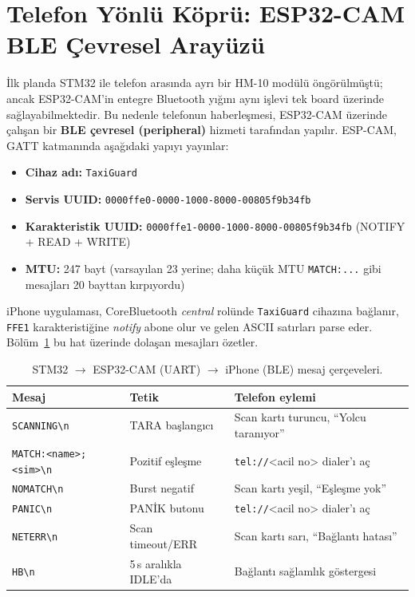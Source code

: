 \section{Telefon Yönlü Köprü: ESP32-CAM BLE Çevresel Arayüzü}

İlk planda STM32 ile telefon arasında ayrı bir HM-10 modülü öngörülmüştü;
ancak ESP32-CAM'in entegre Bluetooth yığını aynı işlevi tek board üzerinde
sağlayabilmektedir. Bu nedenle telefonun haberleşmesi, ESP32-CAM üzerinde
çalışan bir \textbf{BLE çevresel (peripheral)} hizmeti tarafından yapılır.
ESP-CAM, GATT katmanında aşağıdaki yapıyı yayınlar:

\begin{itemize}
    \item \textbf{Cihaz adı:} \texttt{TaxiGuard}
    \item \textbf{Servis UUID:} \texttt{0000ffe0-0000-1000-8000-00805f9b34fb}
    \item \textbf{Karakteristik UUID:} \texttt{0000ffe1-0000-1000-8000-00805f9b34fb}
          (NOTIFY + READ + WRITE)
    \item \textbf{MTU:} 247 bayt (varsayılan 23 yerine; daha küçük MTU
          \texttt{MATCH:...} gibi mesajları 20 bayttan kırpıyordu)
\end{itemize}

iPhone uygulaması, CoreBluetooth \emph{central} rolünde
\texttt{TaxiGuard} cihazına bağlanır, \texttt{FFE1} karakteristiğine
\emph{notify} abone olur ve gelen ASCII satırları parse eder.
Bölüm~\ref{tab:mesaj-cercevesi} bu hat üzerinde dolaşan mesajları özetler.

\begin{table}[h!]
\centering
\caption{STM32 $\rightarrow$ ESP32-CAM (UART) $\rightarrow$ iPhone (BLE) mesaj çerçeveleri.}
\label{tab:mesaj-cercevesi}
\small
\begin{tabular}{l l l}
\toprule
\textbf{Mesaj} & \textbf{Tetik} & \textbf{Telefon eylemi}\\
\midrule
\texttt{SCANNING\textbackslash n} & TARA başlangıcı     & Scan kartı turuncu, ``Yolcu taranıyor''\\
\texttt{MATCH:<name>;<sim>\textbackslash n} & Pozitif eşleşme & \texttt{tel://}<acil no> dialer'ı aç\\
\texttt{NOMATCH\textbackslash n}  & Burst negatif       & Scan kartı yeşil, ``Eşleşme yok''\\
\texttt{PANIC\textbackslash n}    & PANİK butonu        & \texttt{tel://}<acil no> dialer'ı aç\\
\texttt{NETERR\textbackslash n}   & Scan timeout/ERR    & Scan kartı sarı, ``Bağlantı hatası''\\
\texttt{HB\textbackslash n}       & 5\,s aralıkla IDLE'da & Bağlantı sağlamlık göstergesi\\
\bottomrule
\end{tabular}
\end{table}

